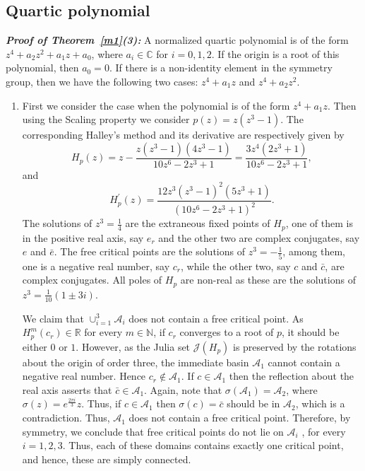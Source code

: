 \documentclass[12pt]{article}
\begin{document}
\subsection{Quartic polynomial}
\textbf{\textit{Proof of Theorem~\ref{m1}(3):}}	A normalized quartic polynomial is of the form $z^4+a_2z^2+a_1z+a_0$, where $a_i \in \mathbb{C}$ for $i=0,1,2$. If the origin is a root of this polynomial, then $a_0=0$. If there is a non-identity element in the symmetry group, then we have the following two cases: $z^4+a_1z$ and $z^4+a_2z^2$.
\begin{enumerate}
\item[(I)] First we consider the case when the polynomial is of the form $z^4+a_1z$. Then using the Scaling property we consider $p(z)=z\left(z^{3}-1\right)$. The corresponding Halley's method and its derivative are respectively given by
\begin{equation}
H_{p}(z)=z-\frac{z\left(z^{3}-1\right)\left(4 z^{3}-1\right)}{10 z^{6}-2 z^{3}+1}=\frac{3 z^{4}\left(2 z^{3}+1\right)}{10 z^{6}-2 z^{3}+1}\label{H_1n3}, 
\end{equation}
and
$$H_{p}^{\prime}(z)=\frac{12 z^{3}\left(z^{3}-1\right)^{2}\left(5 z^{3}+1\right)}{\left(10 z^{6}-2 z^{3}+1\right)^{2}}.$$
The solutions of $z^{3}=\frac{1}{4}$ are the extraneous fixed points of $H_p$, one of them is in the positive real axis, say $e_r$ and the other two are complex conjugates, say $e$ and $\bar{e}$. The
free critical points are the solutions of $z^{3}=-\frac{1}{5}$, among them, one is a negative real number, say $c_r$, while the other two, say $c$ and $\bar{c}$, are complex conjugates.
All poles of $H_p$ are non-real as these are the solutions of $z^{3}=\frac{1}{10}(1 \pm 3 i)$.
\par
We claim that $\cup_{i=1}^{3}\mathcal{A}_{i}$ does not contain a free critical point. As $H_p^m(c_r)\in \mathbb{R}$ for every $m\in \mathbb{N}$, if $c_r$ converges to a root of $p$, it should be either $0$ or $1$. However, as the Julia set $\mathcal{J}(H_p)$ is preserved by the rotations about the origin of order three, the immediate basin $\mathcal{A}_1$ cannot contain a negative real number. Hence $c_r\notin \mathcal{A}_{1}$. If $c\in \mathcal{A}_1$ then the reflection about the real axis asserts that $\bar{c}\in \mathcal{A}_1$. Again, note that $\sigma(\mathcal{A}_1)=\mathcal{A}_2$, where $\sigma(z)=e^{\frac{2\pi i}{3}}z$. Thus, if $c\in \mathcal{A}_1$ then $\sigma(c)=\bar{c}$ should be in $\mathcal{A}_2$, which is a contradiction. Thus, $\mathcal{A}_1$ does not contain a free critical point. Therefore, by symmetry, we conclude that free critical points do not lie on $\mathcal{A}_i$ , for every $i=1,2,3$. Thus, each of these domains contains exactly one critical point, and hence, these are simply connected.

\end{enumerate}
\end{document}
